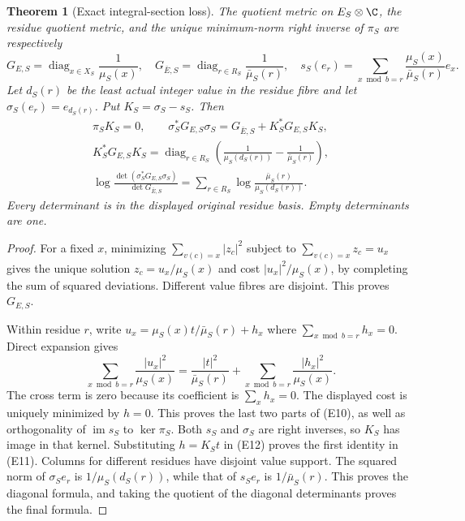 \documentclass[11pt,a4paper]{article}
\newtheorem{theorem}{Theorem}[section]
\begin{document}
\begin{theorem}[Exact integral-section loss]
The quotient metric on \(E_S\otimes\C\), the residue quotient metric,
and the unique minimum-norm right inverse of \(\pi_S\) are respectively
\[
 G_{E,S}=\operatorname{diag}_{x\in X_S}\frac1{\mu_S(x)},\quad
 G_{\bar E,S}=\operatorname{diag}_{r\in R_S}\frac1{\bar\mu_S(r)},\quad
 s_S(e_r)=\sum_{x\bmod b=r}\frac{\mu_S(x)}{\bar\mu_S(r)}e_x .
 \tag{E10}
\]
Let \(d_S(r)\) be the least actual integer value in the residue fibre
and let \(\sigma_S(e_r)=e_{d_S(r)}\).  Put \(K_S=\sigma_S-s_S\).
Then
\[
 \begin{gathered}
 \pi_SK_S=0,\qquad
 \sigma_S^*G_{E,S}\sigma_S
   =G_{\bar E,S}+K_S^*G_{E,S}K_S,\\
 K_S^*G_{E,S}K_S
   =\operatorname{diag}_{r\in R_S}
       \left(\frac1{\mu_S(d_S(r))}-\frac1{\bar\mu_S(r)}\right),\\
 \log\frac{\det(\sigma_S^*G_{E,S}\sigma_S)}{\det G_{\bar E,S}}
   =\sum_{r\in R_S}\log\frac{\bar\mu_S(r)}{\mu_S(d_S(r))}.
 \end{gathered}
 \tag{E11}
\]
Every determinant is in the displayed original residue basis.  Empty
determinants are one.
\end{theorem}
\begin{proof}
For a fixed \(x\), minimizing \(\sum_{v(c)=x}|z_c|^2\) subject to
\(\sum_{v(c)=x}z_c=u_x\) gives the unique solution
\(z_c=u_x/\mu_S(x)\) and cost \(|u_x|^2/\mu_S(x)\), by completing
the sum of squared deviations.  Different value fibres are disjoint.
This proves \(G_{E,S}\).

Within residue \(r\), write \(u_x=\mu_S(x)t/\bar\mu_S(r)+h_x\)
where \(\sum_{x\bmod b=r}h_x=0\).  Direct expansion gives
\[
 \sum_{x\bmod b=r}\frac{|u_x|^2}{\mu_S(x)}
 =\frac{|t|^2}{\bar\mu_S(r)}
  +\sum_{x\bmod b=r}\frac{|h_x|^2}{\mu_S(x)} .
 \tag{E12}
\]
The cross term is zero because its coefficient is
\(\sum_xh_x=0\).  The displayed cost is uniquely minimized by \(h=0\).
This proves the last two parts of (E10), as well as orthogonality of
\(\operatorname{im}s_S\) to \(\ker\pi_S\).  Both \(s_S\) and
\(\sigma_S\) are right inverses, so \(K_S\) has image in that kernel.
Substituting \(h=K_St\) in (E12) proves the first identity in (E11).
Columns for different residues have disjoint value support.
The squared norm of \(\sigma_Se_r\) is
\(1/\mu_S(d_S(r))\), while that of \(s_Se_r\) is
\(1/\bar\mu_S(r)\).  This proves the diagonal formula, and taking
the quotient of the diagonal determinants proves the final formula.
\end{proof}
\end{document}
